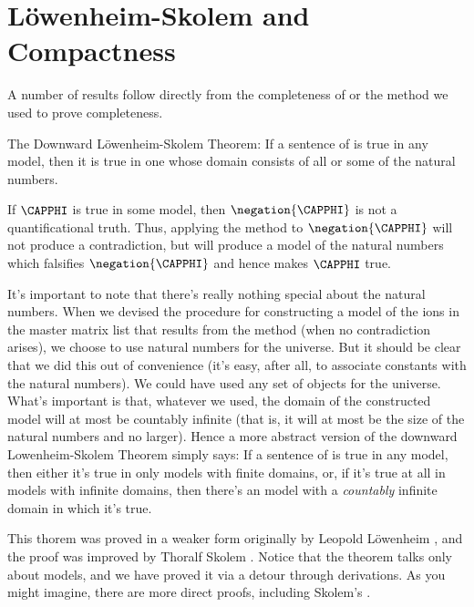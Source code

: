 \section{L\"owenheim-Skolem and Compactness}

A number of results follow directly from the completeness of \GQD{} or the method we used to prove completeness. 
\begin{THEOREM}{ The Downward L\"owenheim-Skolem Theorem:}
If a sentence of \GQL{} is true in any model, then it is true in one whose domain consists of all or some of the natural numbers.
\end{THEOREM}
\begin{PROOF}
If $\CAPPHI$ is true in some model, then $\negation{\CAPPHI}$ is not a quantificational truth.
Thus, applying the method to $\negation{\CAPPHI}$ will not produce a contradiction, but will produce a model of the natural numbers which falsifies $\negation{\CAPPHI}$ and hence makes $\CAPPHI$ true.
\end{PROOF}
It's important to note that there's really nothing special about the natural numbers.
When we devised the procedure for constructing a model of the ions in the master matrix list that results from the method (when no contradiction arises), we choose to use natural numbers for the universe. 
But it should be clear that we did this out of convenience (it's easy, after all, to associate constants with the natural numbers). 
We could have used any set of objects for the universe. 
What's important is that, whatever we used, the domain of the constructed model will at most be countably infinite (that is, it will at most be the size of the natural numbers and no larger). 
Hence a more abstract version of the downward Lowenheim-Skolem Theorem simply says: If a sentence of \GQL{} is true in any model, then either it's true in only models with finite domains, or, if it's true at all in models with infinite domains, then there's an model with a \emph{countably} infinite domain in which it's true. 

This thorem was proved in a weaker form originally by Leopold L\"owenheim \citeyearpar{Lowenheim1915}, and the proof was improved by Thoralf Skolem \citeyearpar{Skolem1920,Skolem1922}. 
Notice that the theorem talks only about models, and we have proved it via a detour through derivations. 
As you might imagine, there are more direct proofs, including Skolem's \citetext{\citealp{Tarski1956}, \citealp{Vaught1974}, \citealp[ch.~3.1]{Hodges1997}, \citeyear[63]{Hodges2001}}.

